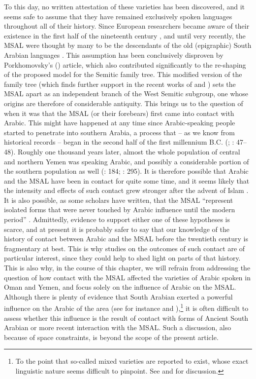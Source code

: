 \documentclass[output=paper]{langsci/langscibook}
\begin{document}
To this day, no written attestation of these varieties has been discovered, and it seems safe to assume that they have remained exclusively spoken languages throughout all of their history. Since European researchers became aware of their existence in the first half of the nineteenth century \citep{Wellsted1837}, and until very recently, the MSAL were thought by many to be the descendants of the old (epigraphic) South Arabian languages \citep[16]{Rubin2014}. This assumption has been conclusively disproven by Porkhomovsky’s (\citeyear{Porkhomovsky1997}) article, which also contributed significantly to the re-shaping of the proposed model for the Semitic family tree. This modified version of the family tree (which finds further support in the recent works of \citealt{Kogan2015} and \citealt{Edzard2017}) sets the MSAL apart as an independent branch of the West Semitic subgroup, one whose origins are therefore of considerable antiquity. This brings us to the question of when it was that the MSAL (or their forebears) first came into contact with Arabic. This might have happened at any time since Arabic-speaking people started to penetrate into southern Arabia, a process that – as we know from historical records – began in the second half of the first millennium B.C. (\citealt{Robin1991}; \citealt{Hoyland2001}: 47--48). Roughly one thousand years later, almost the whole population of central and northern Yemen was speaking Arabic, and possibly a considerable portion of the southern population as well (\citealt{Beeston1981}: 184; \citealt{Zammit2011}: 295). It is therefore possible that Arabic and the MSAL have been in contact for quite some time, and it seems likely that the intensity and effects of such contact grew stronger after the advent of Islam \citep[247]{Lonnet2011}. It is also possible, as some scholars have written, that the MSAL “represent isolated forms that were never touched by Arabic influence until the modern period” \citep[127]{Versteegh2014book}. Admittedly, evidence to support either one of these hypotheses is scarce, and at present it is probably safer to say that our knowledge of the history of contact between Arabic and the MSAL before the twentieth century is fragmentary at best. This is why studies on the outcomes of such contact are of particular interest, since they could help to shed light on parts of that history. This is also why, in the course of this chapter, we will refrain from addressing the question of how contact with the MSAL affected the varieties of Arabic spoken in Oman and Yemen, and focus solely on the influence of Arabic on the MSAL. Although there is plenty of evidence that South Arabian exerted a powerful influence on the Arabic of the area (see for instance \citealt{Retsö2000} and \citealt{Watson2018}),\footnote{To the point that so-called mixed varieties are reported to exist, whose exact linguistic nature seems difficult to pinpoint. See \citet{WatsonEtAl2006} and \citet{Watson2011SAYemeni} for discussion.} it is often difficult to assess whether this influence is the result of contact with forms of Ancient South Arabian or more recent interaction with the MSAL. Such a discussion, also because of space constraints, is beyond the scope of the present article.
\end{document}
